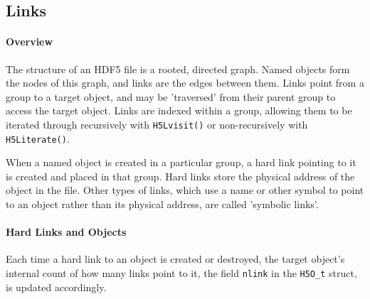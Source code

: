 \subsection{Links}

\paragraph{Overview} The structure of an HDF5 file is a rooted, directed graph. Named objects form the nodes of this graph, and links are the edges between them. Links point from a group to a target object, and may be 'traversed' from their parent group to access the target object. Links are indexed within a group, allowing them to be iterated through recursively with \texttt{H5Lvisit()} or non-recursively with \texttt{H5Literate()}. 

When a named object is created in a particular group, a hard link pointing to it is created and placed in that group. Hard links store the physical address of the object in the file. Other types of links, which use a name or other symbol to point to an object rather than its physical address, are called 'symbolic links'.

\paragraph{Hard Links and Objects} Each time a hard link to an object is created or destroyed, the target object's internal count of how many links point to it, the field \texttt{nlink} in the \texttt{H5O\_t} struct, is updated accordingly.

